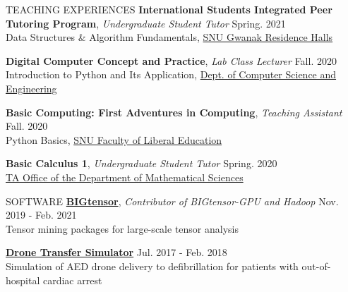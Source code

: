 \documentclass[10pt]{resume} %
\begin{document}
\begin{rSection}{TEACHING EXPERIENCES} 
{\bf International Students Integrated Peer Tutoring Program}, \textit{Undergraduate Student Tutor} \hfill Spring. 2021 \\
Data Structures \& Algorithm Fundamentals, \href{https://dorm.snu.ac.kr/}{SNU Gwanak Residence Halls}

{\bf Digital Computer Concept and Practice}, \textit{Lab Class Lecturer} \hfill Fall. 2020 \\
Introduction to Python and Its Application, \href{https://cse.snu.ac.kr/}{Dept. of Computer Science and Engineering}

{\bf Basic Computing: First Adventures in Computing}, \textit{Teaching Assistant} \hfill Fall. 2020 \\
Python Basics, \href{https://liberaledu.snu.ac.kr/}{SNU Faculty of Liberal Education}

{\bf Basic Calculus 1}, \textit{Undergraduate Student Tutor} \hfill Spring. 2020 \\
\href{http://www.math.snu.ac.kr/}{TA Office of the Department of Mathematical Sciences}
\end{rSection}

\newpage
\begin{rSection}{SOFTWARE}
\href{https://datalab.snu.ac.kr/bigtensor/}{\bf BIGtensor},
\textit{Contributor of BIGtensor-GPU and Hadoop} \hfill Nov. 2019 - Feb. 2021 \\ 
Tensor mining packages for large-scale tensor analysis

\href{https://github.com/rubis-lab/DroneTransferSimulator/}{\bf Drone Transfer Simulator}  \hfill Jul. 2017 - Feb. 2018 \\
Simulation of AED drone delivery to defibrillation for patients with out-of-hospital cardiac arrest
\end{rSection}
\end{document}
